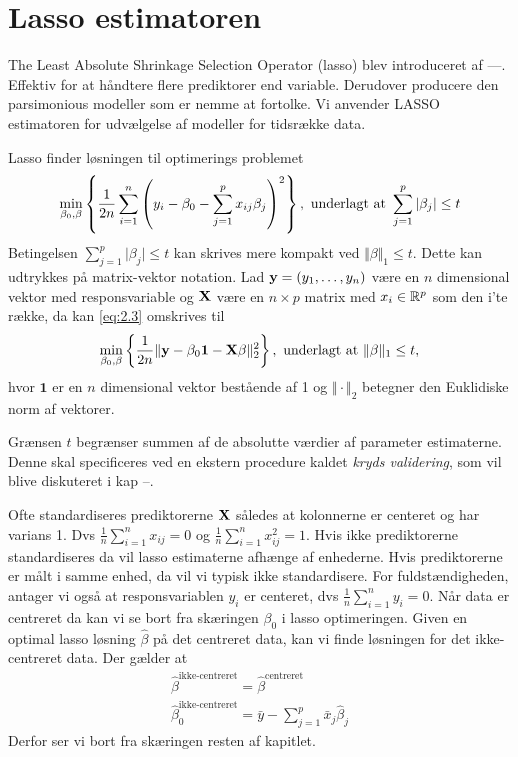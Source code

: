 \section{Lasso estimatoren}
The Least Absolute Shrinkage Selection Operator (lasso) blev introduceret af ---. 
Effektiv for at håndtere flere prediktorer end variable.
Derudover producere den parsimonious modeller som er nemme at fortolke.
Vi anvender LASSO estimatoren for udvælgelse af modeller for tidsrække data.

Lasso finder løsningen til optimerings problemet
\begin{align}
\min_{\beta_0, \beta} \cbr{\frac{1}{2n} \sum_{i=1}^n \del{y_i - \beta_0 - \sum_{j=1}^p x_{ij} \beta_j}^2}, \ \text{underlagt at } \sum_{j=1}^p \vert \beta_j \vert \leq t \label{eq:2.3}
\end{align}
Betingelsen $\sum_{j=1}^p \vert \beta_j \vert \leq t$ kan skrives mere kompakt ved $\Vert \beta \Vert_1 \leq t$.
Dette kan udtrykkes på matrix-vektor notation.
Lad \(\mathbf{y}=(y_1, \ldots, y_n)\) være en \(n\) dimensional vektor med responsvariable og \(\mathbf{X}\) være en $n \times p$ matrix med $x_i \in \mathbb{R}^p$ som den i'te række, da kan \eqref{eq:2.3} omskrives til
\begin{align*}
\min_{\beta_0, \beta} \cbr{\frac{1}{2n} \Vert \y - \beta_0 \mathbf{1} - \X \beta \Vert_2^2}, \ \text{underlagt at } \Vert \beta \Vert_1 \leq t,
\end{align*}
hvor \(\mathbf{1}\) er en \(n\) dimensional vektor bestående af 1 og \(\Vert \cdot \Vert_2\) betegner den Euklidiske norm af vektorer.

Grænsen \(t\) begrænser summen af de absolutte værdier af parameter estimaterne.
Denne skal specificeres ved en ekstern procedure kaldet \textit{kryds validering}, som vil blive diskuteret i kap --.

Ofte standardiseres prediktorerne \(\mathbf{X}\) således at kolonnerne er centeret og har varians 1. Dvs \(\frac{1}{n} \sum_{i=1}^n x_{ij} = 0\) og \(\frac{1}{n} \sum_{i=1}^n x_{ij}^2=1\). Hvis ikke prediktorerne standardiseres da vil lasso estimaterne afhænge af enhederne.
Hvis prediktorerne er målt i samme enhed, da vil vi typisk ikke standardisere.
For fuldstændigheden, antager vi også at responsvariablen $y_i$ er centeret, dvs \(\frac{1}{n} \sum_{i=1}^n y_{i} = 0\).
Når data er centreret da kan vi se bort fra skæringen $\beta_0$ i lasso optimeringen.
Given en optimal lasso løsning \(\hat{\beta}\) på det centreret data, kan vi finde løsningen for det ikke-centreret data. Der gælder at
\begin{align*}
\hat{\beta}^{\text{ikke-centreret}} = \hat{\beta}^{\text{centreret}} \\
\hat{\beta}_0^{\text{ikke-centreret}} = \bar{y} - \sum_{j=1}^p \bar{x}_j \hat{\beta}_j
\end{align*}
Derfor ser vi bort fra skæringen resten af kapitlet.

